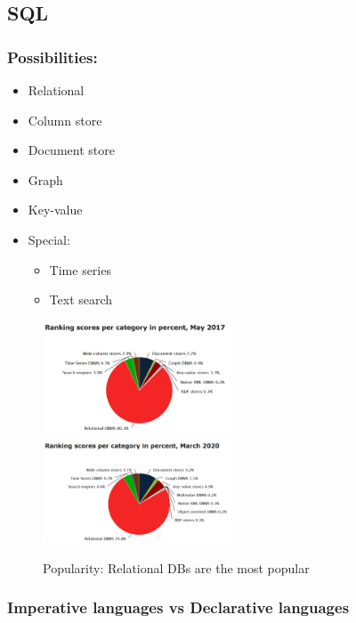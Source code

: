 \documentclass{article}
\begin{document}
\subsection{SQL}

\subsubsection{Possibilities:}

\begin{itemize}
    \item Relational
    \item Column store 
    \item Document store
    \item Graph
    \item Key-value
    \item Special:
    \begin{itemize}
        \item Time series
        \item Text search
    \end{itemize}
\end{itemize}

\begin{figure}[H]
    \centering
    \includegraphics[width=0.5\textwidth]{sql-piechart.png}
    \includegraphics[width=0.5\textwidth]{sql-piechart2.png}
    \caption{Popularity: Relational DBs are the most popular}
\end{figure}

\subsubsection{Imperative languages vs Declarative languages}
\end{document}
